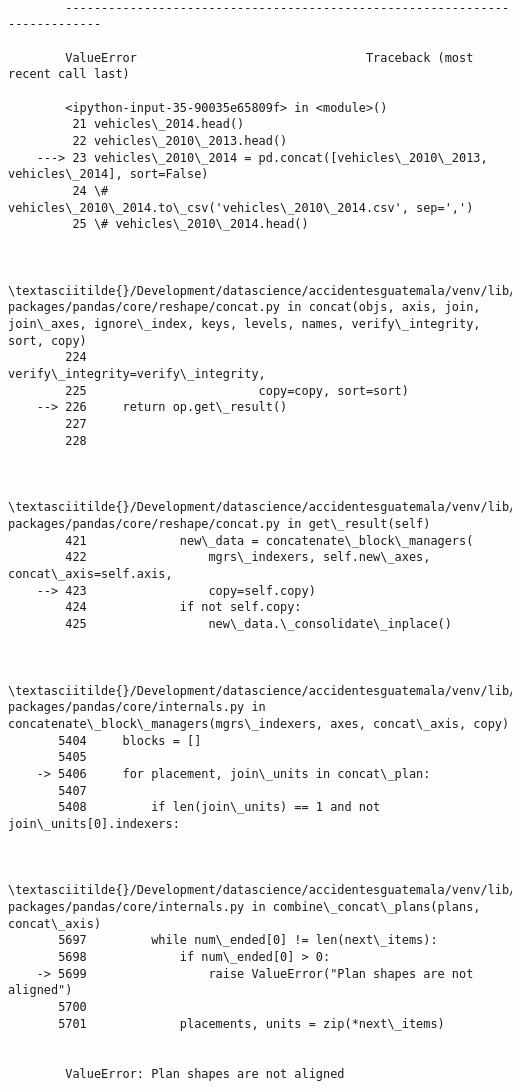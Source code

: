 \documentclass[11pt]{article}
\begin{document}
    \begin{Verbatim}[commandchars=\\\{\}]

        ---------------------------------------------------------------------------

        ValueError                                Traceback (most recent call last)

        <ipython-input-35-90035e65809f> in <module>()
         21 vehicles\_2014.head()
         22 vehicles\_2010\_2013.head()
    ---> 23 vehicles\_2010\_2014 = pd.concat([vehicles\_2010\_2013, vehicles\_2014], sort=False)
         24 \# vehicles\_2010\_2014.to\_csv('vehicles\_2010\_2014.csv', sep=',')
         25 \# vehicles\_2010\_2014.head()


        \textasciitilde{}/Development/datascience/accidentesguatemala/venv/lib/python3.6/site-packages/pandas/core/reshape/concat.py in concat(objs, axis, join, join\_axes, ignore\_index, keys, levels, names, verify\_integrity, sort, copy)
        224                        verify\_integrity=verify\_integrity,
        225                        copy=copy, sort=sort)
    --> 226     return op.get\_result()
        227 
        228 


        \textasciitilde{}/Development/datascience/accidentesguatemala/venv/lib/python3.6/site-packages/pandas/core/reshape/concat.py in get\_result(self)
        421             new\_data = concatenate\_block\_managers(
        422                 mgrs\_indexers, self.new\_axes, concat\_axis=self.axis,
    --> 423                 copy=self.copy)
        424             if not self.copy:
        425                 new\_data.\_consolidate\_inplace()


        \textasciitilde{}/Development/datascience/accidentesguatemala/venv/lib/python3.6/site-packages/pandas/core/internals.py in concatenate\_block\_managers(mgrs\_indexers, axes, concat\_axis, copy)
       5404     blocks = []
       5405 
    -> 5406     for placement, join\_units in concat\_plan:
       5407 
       5408         if len(join\_units) == 1 and not join\_units[0].indexers:


        \textasciitilde{}/Development/datascience/accidentesguatemala/venv/lib/python3.6/site-packages/pandas/core/internals.py in combine\_concat\_plans(plans, concat\_axis)
       5697         while num\_ended[0] != len(next\_items):
       5698             if num\_ended[0] > 0:
    -> 5699                 raise ValueError("Plan shapes are not aligned")
       5700 
       5701             placements, units = zip(*next\_items)


        ValueError: Plan shapes are not aligned

    \end{Verbatim}


    
    
    
    
\end{document}
